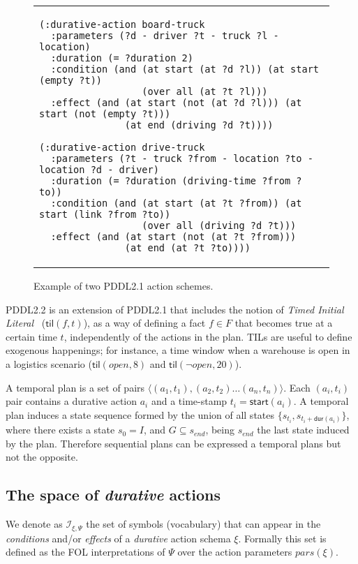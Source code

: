 \documentclass{ecai}
\newcommand{\tup}[1]{{\langle #1 \rangle}}
\newcommand{\dur}{\mathsf{dur}}    %
\newcommand{\start}{\mathsf{start}}%
\newcommand{\til}{\mathsf{til}}    %
\begin{document}
\begin{figure}
  \begin{tabular}{p{\textwidth}}
\begin{tiny}    
\begin{verbatim}
(:durative-action board-truck
  :parameters (?d - driver ?t - truck ?l - location)
  :duration (= ?duration 2)
  :condition (and (at start (at ?d ?l)) (at start (empty ?t))
                  (over all (at ?t ?l)))
  :effect (and (at start (not (at ?d ?l))) (at start (not (empty ?t)))
               (at end (driving ?d ?t))))

(:durative-action drive-truck
  :parameters (?t - truck ?from - location ?to - location ?d - driver)
  :duration (= ?duration (driving-time ?from ?to))
  :condition (and (at start (at ?t ?from)) (at start (link ?from ?to))
                  (over all (driving ?d ?t)))
  :effect (and (at start (not (at ?t ?from))) 
               (at end (at ?t ?to))))
\end{verbatim}
\end{tiny}    
\end{tabular}
\caption{\small Example of two PDDL2.1 action schemes.}
\label{fig:exampleactions2}
\end{figure}

PDDL2.2 is an extension of PDDL2.1 that includes the notion of {\em Timed Initial Literal}~\cite{hoffmann2005} ($\til(f,t)$), as a way of defining a fact $f\in F$ that becomes true at a certain time $t$, independently of the actions in the plan. TILs are useful to define exogenous happenings; for instance, a time window when a warehouse is open in a logistics scenario ($\til(open,8)$ and $\til(\neg open,20)$).


A temporal plan is a set of pairs $\tup{(a_1,t_1),(a_2,t_2)\ldots (a_n,t_n)}$. Each $(a_i,t_i)$ pair contains a durative action $a_i$ and a time-stamp $t_i=\start(a_i)$. A temporal plan induces a state sequence formed by the union of all states $\{s_{t_i}, s_{t_i+\dur(a_i)}\}$, where there exists a state $s_{0}=I$, and $G\subseteq s_{end}$, being $s_{end}$ the last state induced by the plan. Therefore sequential plans can be expressed a temporal plans but not the opposite.


\subsection{The space of {\em durative} actions}
\label{sec:action-space}

We denote as ${\mathcal I}_{\xi,\Psi}$ the set of symbols (vocabulary) that can appear in the {\em conditions} and/or {\em effects} of a {\em durative} action schema $\xi$. Formally this set is defined as the FOL interpretations of $\Psi$ over the action parameters $pars(\xi)$.
\end{document}
